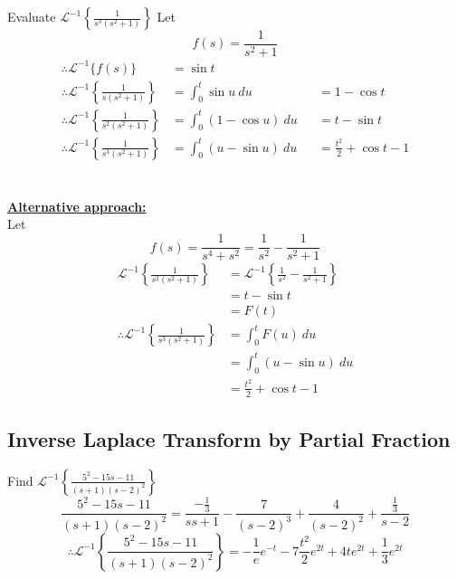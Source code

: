 \documentclass[12pt]{article}
\newcommand{\Lapinv}{\mathscr{L}^{-1}}
\begin{document}
\begin{example}{Evaluate $\displaystyle \Lapinv \left\{ \frac{1}{s^3(s^2+1)} \right\}$}{}
    Let \[
        f(s) = \frac{1}{s^2+1}
    \]
    \begin{align*}
        \therefore \Lapinv \{ f(s) \} &= \sin{t} \\
        \therefore \Lapinv \left\{ \frac{1}{s(s^2+1)} \right\} &= \int_{0}^{t} {\sin{u}} \: d{u} &&= 1-\cos{t}\\
        \therefore \Lapinv \left\{ \frac{1}{s^2(s^2+1)} \right\} &= \int_{0}^{t} {(1-\cos{u})} \: d{u} &&= t - \sin{t} \\
        \therefore \Lapinv \left\{ \frac{1}{s^3(s^2+1)} \right\} &= \int_{0}^{t} {(u-\sin{u})} \: d{u} &&= \frac{t^2}{2} + \cos{t} - 1
    \end{align*}\\~\\
    
    \underline{\textbf{Alternative approach: }}
    \\Let \[
        f(s) = \frac{1}{s^4 + s^2} = \frac{1}{s^2} - \frac{1}{s^2+1}
    \]
    \begin{align*}
        \Lapinv \left\{ \frac{1}{s^2(s^2+1)} \right\} &= \Lapinv \left\{ \frac{1}{s^2} - \frac{1}{s^2+1} \right\} \\
        &= t - \sin{t} \\
        &= F(t) \\
        \therefore \Lapinv \left\{ \frac{1}{s^3(s^2+1)} \right\} &= \int_{0}^{t} {F(u)} \: d{u} \\
        &= \int_{0}^{t} {(u-\sin{u})} \: d{u} \\
        &= \frac{t^2}{2} + \cos{t} - 1
    \end{align*}
\end{example}


\subsection{Inverse Laplace Transform by Partial Fraction}

\begin{example}{Find $\displaystyle \Lapinv \left\{ \frac{5^2 - 15s - 11}{(s+1)(s-2)^2} \right\}$}{}
    \[
        \frac{5^2 - 15s - 11}{(s+1)(s-2)^2} = \frac{-\frac{1}{3}}{ss+1} - \frac{7}{(s-2)^3} + \frac{4}{(s-2)^2} + \frac{\frac{1}{3}}{s-2}
    \] \[
        \therefore \Lapinv \left\{ \frac{5^2 - 15s - 11}{(s+1)(s-2)^2} \right\} = -\frac{1}{e}e^{-t} - 7 \frac{t^2}{2} e^{2t} + 4te^{2t} + \frac{1}{3}e^{2t}
    \]
\end{example}
\end{document}
